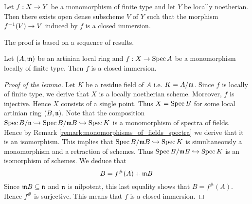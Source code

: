 \begin{theorem}\label{theorem:monomorphisms_are_locally_densely_on_base_closed_immersions}
Let $f:X\rightarrow Y$ be a monomorphism of finite type and let $Y$ be locally noetherian. Then there exists open dense subscheme $V$ of $Y$ such that the morphism $f^{-1}(V)\rightarrow V$ induced by $f$ is a closed immersion.
\end{theorem}
The proof is based on a sequence of results.

\begin{lemma}\label{lemma:monomorphisms_over_artinian_local_rings}
Let $(A,\mathfrak{m})$ be an artinian local ring and $f:X\rightarrow \mathrm{Spec}\, A$ be a monomorphism locally of finite type. Then $f$ is a closed immersion.
\end{lemma}
\begin{proof}[Proof of the lemma]
Let $K$ be a residue field of $A$ i.e. $K = A/\mathfrak{m}$. Since $f$ is locally of finite type, we derive that $X$ is a locally noetherian scheme. Moreover, $f$ is injective. Hence $X$ consists of a single point. Thus $X = \mathrm{Spec}\, B$ for some local artinian ring $(B,\mathfrak{n})$. Note that the composition $\mathrm{Spec}\, B/\mathfrak{n}\hookrightarrow \mathrm{Spec}\, B/\mathfrak{m}B \hookrightarrow \mathrm{Spec}\, K$ is a monomorphism of spectra of fields. Hence by Remark \ref{remark:monomorphisms_of_fields_spectra} we derive that it is an isomorphism. This implies that $\mathrm{Spec}\, B/\mathfrak{m}B\hookrightarrow \mathrm{Spec}\, K$ is simultaneously a monomorphism and a retraction of schemes. Thus $\mathrm{Spec}\, B/\mathfrak{m}B\hookrightarrow \mathrm{Spec}\, K$ is an isomorphism of schemes. We deduce that
$$B = f^{\#}(A) + \mathfrak{m}B$$
Since $\mathfrak{m}B \subseteq \mathfrak{n}$ and $\mathfrak{n}$ is nilpotent, this last equality shows that $B = f^{\#}(A)$. Hence $f^{\#}$ is surjective. This means that $f$ is a closed immersion.
\end{proof}

